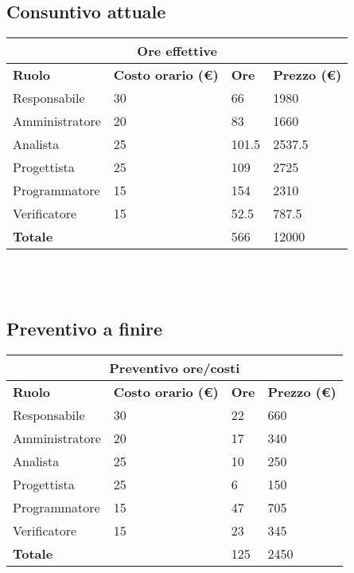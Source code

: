 \documentclass[a4paper, 12pt]{article}
\begin{document}
\subsection{Consuntivo attuale}
\begin{center}
    \begin{tabularx}{\textwidth}{|X|X|X|X|}
        \hline
        \multicolumn{4}{|c|}{\textbf{Ore effettive}}\\
        \hline
        \hline
        \textbf{Ruolo} & \textbf{Costo orario (\euro)} & \textbf{Ore} & \textbf{Prezzo (\euro)}\\
        \hline
        Responsabile    & 30 & 66  & 1980\\
        \hline
        Amministratore  & 20 & 83  & 1660\\
        \hline
        Analista        & 25 & 101.5  & 2537.5 \\
        \hline
        Progettista     & 25 & 109  & 2725\\
        \hline
        Programmatore   & 15 & 154  & 2310\\
        \hline
        Verificatore    & 15 & 52.5  & 787.5 \\
        \hline
        \hline
        \textbf{Totale} &    & 566 & 12000\\
        \hline
    \end{tabularx}\\[8pt]
    \mbox{}\\
\end{center}

\subsection{Preventivo a finire}
\begin{center}
    \begin{tabularx}{\textwidth}{|X|X|X|X|}
        \hline
        \multicolumn{4}{|c|}{\textbf{Preventivo ore/costi}}\\
        \hline
        \hline
        \textbf{Ruolo} & \textbf{Costo orario (\euro)} & \textbf{Ore} & \textbf{Prezzo (\euro)}\\
        \hline
        Responsabile    & 30 & 22  & 660\\
        \hline
        Amministratore  & 20 & 17  & 340\\
        \hline
        Analista        & 25 & 10  & 250\\
        \hline
        Progettista     & 25 & 6  & 150\\
        \hline
        Programmatore   & 15 & 47  & 705\\
        \hline
        Verificatore    & 15 & 23  & 345\\
        \hline
        \hline
        \textbf{Totale} &    & 125 & 2450\\
        \hline
    \end{tabularx}\\[8pt]
    \mbox{}\\
\end{center}
\end{document}
